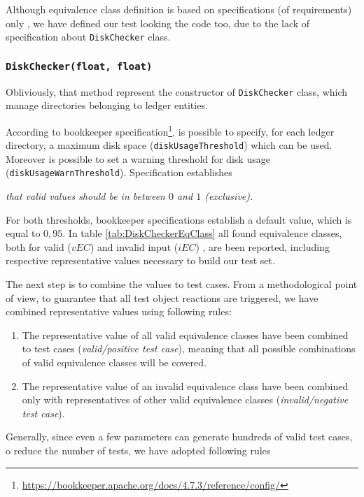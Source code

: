 \documentclass[conference, onecolumn]{IEEEtran}
\begin{document}
Although equivalence class definition is based on specifications (of requirements) only \cite{FoundationSoftwareTesting}, we have defined our test looking the code too, due to the lack of specification about \texttt{DiskChecker} class.

\subsubsection{\texttt{DiskChecker(float, float)}}

Obliviously, that method represent the constructor of \texttt{DiskChecker} class, which manage directories belonging to ledger entities. 

According to bookkeeper specification\footnote{\url{https://bookkeeper.apache.org/docs/4.7.3/reference/config/}}, is possible to specify, for each ledger directory, a maximum disk space (\texttt{diskUsageThreshold}) which can be used. Moreover is possible to set a warning threshold for disk usage (\texttt{diskUsageWarnThreshold}). Specification establishes 

\vspace{5pt}
\textit{that valid values should be in between $0$ and $1$ (exclusive).}
\vspace{5pt}

For both thresholds, bookkeeper specifications establish a default value, which is equal to $0,95$. In table \ref{tab:DiskCheckerEqClass} all found equivalence classes, both for valid ($vEC$) and invalid input ($iEC$) , are been reported, including respective representative values necessary to build our test set. 

The next step is to combine the values to test cases. From a methodological point of view, to guarantee that all test object reactions are triggered, we have combined representative values using following rules:
\begin{enumerate}
\item The representative value of all valid equivalence classes have been combined to test cases (\textit{valid/positive test case}), meaning that all possible combinations of valid equivalence classes will be covered. 
\item The representative value of an invalid equivalence class have been combined only with representatives of other valid equivalence classes (\textit{invalid/negative test case}).
\end{enumerate}

Generally, since even a few parameters can generate hundreds of valid test cases, o reduce the number of tests, we have adopted following rules
\end{document}

